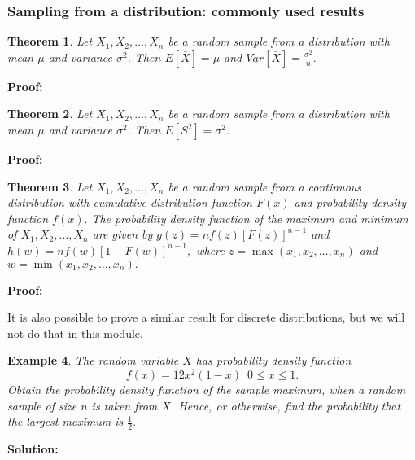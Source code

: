 \documentclass[12pt]{article}
\newtheorem{theorem}{Theorem}[section]
\newtheorem{example}[theorem]{Example}
\begin{document}
\subsubsection{Sampling from a distribution: commonly used results}
\begin{theorem}
Let $X_{1},X_{2},\ldots,X_{n}$ be a random sample from a distribution with mean $\mu$ and variance $\sigma^2$. Then $\displaystyle E[\bar{X}]=\mu$ and $\displaystyle Var[\bar{X}]=\frac{\sigma^2}{n}.$
\end{theorem}
\begin{mdframed}
{\bf Proof:}
\textcolor[rgb]{1.00,1.00,1.00}{\lipsum[1-3]}
\end{mdframed}

\begin{theorem}
Let $X_{1},X_{2},\ldots,X_{n}$ be a random sample from a distribution with mean $\mu$ and variance $\sigma^2$. Then $\displaystyle E[S^{2}]=\sigma^2$.
\end{theorem}
\begin{mdframed}
{\bf Proof:}
\textcolor[rgb]{1.00,1.00,1.00}{\lipsum[1-3]}
\end{mdframed}

\begin{theorem}
Let $X_{1},X_{2},\ldots,X_{n}$ be a random sample from a continuous distribution with cumulative distribution function $F(x)$ and probability density function $f(x).$ The probability density function of the maximum and minimum of $X_{1},X_{2},\ldots,X_{n}$ are given by $\displaystyle g(z)=nf(z)[F(z)]^{n-1}$ and $\displaystyle h(w)=nf(w)[1-F(w)]^{n-1},$ where $z=\max(x_{1},x_{2},\ldots,x_{n})$ and $w=\min(x_{1},x_{2},\ldots,x_{n}).$
\end{theorem}
\begin{mdframed}
{\bf Proof:}
\textcolor[rgb]{1.00,1.00,1.00}{\lipsum[1-8]}
\end{mdframed}
It is also possible to prove a similar result for discrete distributions, but we will not do that in this module.
\begin{example}
The random variable $X$ has probability density function
$$f(x)=12x^{2}(1-x)\,\,\, 0\leq x \leq 1.$$ Obtain the probability density function of the sample maximum, when a random sample of size $n$ is taken from $X$. Hence, or otherwise, find the probability that the largest maximum is $\frac{1}{2}.$
\end{example}
\begin{mdframed}
{\bf Solution:}
\textcolor[rgb]{1.00,1.00,1.00}{\lipsum[1-7]}
\end{mdframed}
\end{document}
